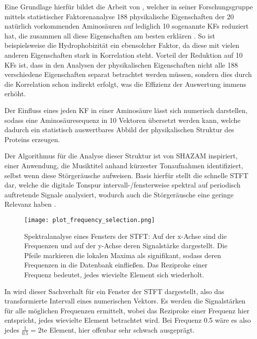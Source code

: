    Eine Grundlage hierfür bildet die Arbeit von \citeauthor{kidera}, welcher in seiner Forschungsgruppe mittels statistischer Faktorenanalyse 188 physikalische Eigenschaften der 20 natürlich vorkommenden Aminosäuren auf lediglich 10 sogenannte \acp{KF} reduziert hat, die zusammen all diese Eigenschaften am besten erklären . So ist beispielsweise die Hydrophobizität ein ebensolcher Faktor, da diese mit vielen anderen Eigenschaften stark in Korrelation steht. Vorteil der Reduktion auf 10 \acp{KF} ist, dass in den Analysen der physikalischen Eigenschaften nicht alle 188 verschiedene Eigenschaften separat betrachtet werden müssen, sondern dies durch die Korrelation schon indirekt erfolgt, was die Effizienz der Auswertung immens erhöht.

    Der Einfluss eines jeden \ac{KF} in einer Aminosäure lässt sich numerisch darstellen, sodass eine Aminosäuresequenz in 10 Vektoren übersetzt werden kann, welche dadurch ein statistisch auswertbares Abbild der physikalischen Struktur des Proteins erzeugen.

    Der Algorithmus für die Analyse dieser Struktur ist von SHAZAM inspiriert, einer Anwendung, die Musiktitel anhand kürzester Tonaufnahmen identifiziert, selbst wenn diese Störgeräusche aufweisen. Basis hierfür stellt die schnelle \ac{STFT} dar, welche die digitale Tonspur intervall-/fensterweise spektral auf periodisch auftretende Signale analysiert, wodurch auch die Störgeräusche eine geringe Relevanz haben .

    \begin{figure}[H]
        \texttt{[image: plot\_frequency\_selection.png]}
        \caption[Spektralanalyse eines Intervalls/Fensters der STFT]{Spektralanalyse eines Fensters der \ac{STFT}\@: Auf der x-Achse sind die Frequenzen und auf der y-Achse deren Signalstärke dargestellt. Die Pfeile markieren die lokalen Maxima als signifikant, sodass deren Frequenzen in die Datenbank einfließen. Das Reziproke einer Frequenz bedeutet, jedes wievielte Element sich wiederholt.}
        \label{fig:freq_selection}
    \end{figure}

    In  wird dieser Sachverhalt für ein Fenster der \ac{STFT} dargestellt, also das transformierte Intervall eines numerischen Vektors. Es werden die Signalstärken für alle möglichen Frequenzen ermittelt, wobei das Reziproke einer Frequenz hier entspricht, jedes wievielte Element betrachtet wird. Bei Frequenz 0.5 wäre es also jedes $\frac{1}{0.5} = 2$te Element, hier offenbar sehr schwach ausgeprägt.

